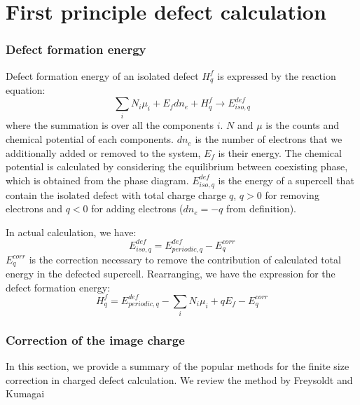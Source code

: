 \documentclass{article}
\begin{document}
\part{First principle defect calculation}

\section{Defect formation energy}

Defect formation energy of an isolated defect $H^f_q$ is expressed by the reaction equation:
\begin{equation}
    \sum_i N_i \mu_i + E_f dn_e + H^f_q \to E^{def}_{iso,q}
\end{equation}
where the summation is over all the components $i$. $N$ and $\mu$ is the counts and 
chemical potential of each components. $dn_e$ is the number of electrons that we additionally 
added or removed to the system, $E_f$ is their energy. The chemical potential is calculated by 
considering the equilibrium between coexisting phase, which is obtained from the phase 
diagram\cite{Kuwabara2004}. $E^{def}_{iso,q}$ is the energy of a supercell that contain the isolated defect with total charge
charge $q$, $q > 0$ for removing electrons and $q < 0$ for adding electrons ($dn_e = - q$ from definition).

In actual calculation, we have:
\begin{equation}
    E^{def}_{iso,q} = E^{def}_{periodic,q} - E^{corr}_q
\end{equation}
$E^{corr}_q$ is the correction necessary to remove the contribution of calculated total 
energy in the defected supercell. Rearranging, we have the expression for the 
defect formation energy:
\begin{equation}
    H^{f}_q = E^{def}_{periodic,q} - \sum_i N_i \mu_i + qE_f - E^{corr}_q
\end{equation}

\section{Correction of the image charge}
In this section, we provide a summary of the popular methods for the 
finite size correction in charged defect calculation. We review the method
by Freysoldt\cite{Freydoldt2009} and Kumagai\cite{Kumagai2014}
\end{document}
